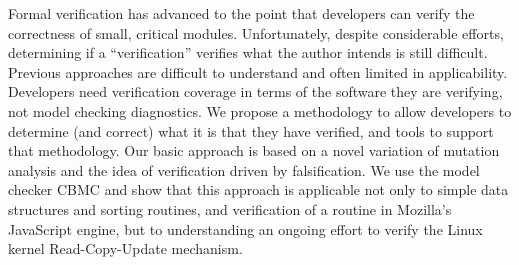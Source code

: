 Formal verification has advanced to the point that developers can verify the correctness of small, critical modules.  Unfortunately, despite considerable efforts, determining if a ``verification'' verifies what the author intends is still difficult.  Previous approaches are difficult to understand and often limited in applicability.  Developers need verification coverage in terms of the software they are verifying, not model checking diagnostics.  We propose a methodology to allow developers to determine (and correct) what it is that they have verified, and tools to support that methodology.  Our basic approach is based on a novel variation of mutation analysis and the idea of verification driven by falsification.  We use the model checker CBMC and show that this approach is applicable not only to simple data structures and sorting routines, and verification of a routine in Mozilla's JavaScript engine, but to understanding an ongoing effort to verify the Linux kernel Read-Copy-Update mechanism.
